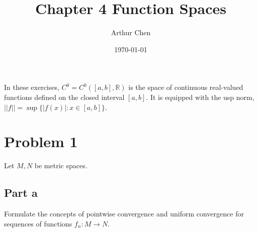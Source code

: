 \documentclass{article}
\author{Arthur Chen}
\title{Chapter 4 Function Spaces}
\date{\today}
\newcommand{\R}{\mathbb{R}}
\begin{document}
\maketitle

In these exercises, $C^0 = C^0([a, b], \R)$ is the space of continuous real-valued functions defined on the closed interval $[a, b]$. It is equipped with the usp norm, $||f|| = \sup \{|f(x)|: x \in [a, b]\}$.

\section*{Problem 1}

Let $M, N$ be metric spaces.

\subsection*{Part a}

Formulate the concepts of pointwise convergence and uniform convergence for sequences of functions $f_n: M \rightarrow N$.
\end{document}
